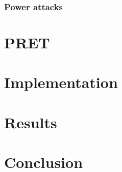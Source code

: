 \documentclass[times, 10pt,twocolumn]{article}
\begin{document}
\subsubsection{Power attacks}
\section{PRET}


\section{Implementation}

\section{Results}


\section{Conclusion}




\end{document}
